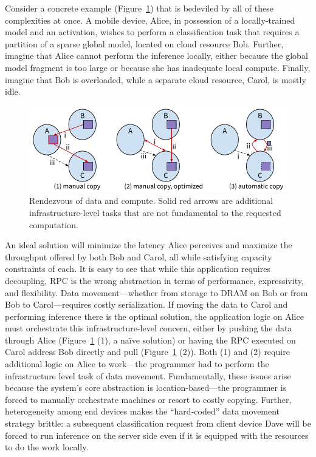 Consider a concrete example (Figure~\ref{fig:rpccopy}) that is bedeviled by all of these complexities at once. A mobile device,
Alice, in possession of a locally-trained model and an activation, wishes to perform a
classification task that requires a partition of a sparse global model, located on cloud resource
Bob. Further, imagine that Alice cannot perform the inference locally, either because the global
model fragment is too large or because she has inadequate local compute. Finally, imagine that Bob
is overloaded, while a separate cloud resource, Carol, is mostly idle.


\begin{figure}
    \centering
    \includegraphics[width=\linewidth]{fig/copy}
    \caption{Rendezvous of data and compute. Solid red arrows are additional
        infrastructure-level tasks that are not fundamental to the requested computation.}
    \label{fig:rpccopy}
\end{figure}

An ideal solution will minimize the latency Alice perceives and maximize the throughput offered
by both Bob and Carol, all while satisfying capacity constraints of each. It is easy to see
that while this application requires decoupling, RPC is the wrong abstraction in terms of performance,
expressivity, and flexibility.  Data movement---whether from storage to DRAM on Bob or from Bob
to Carol---requires costly serialization. If moving the data to Carol and performing
inference there is the optimal solution, the application logic on Alice must orchestrate this
infrastructure-level concern, either by pushing the data through Alice (Figure~\ref{fig:rpccopy} (1), a na\"ive solution)
or having the RPC executed
on Carol address Bob directly and pull (Figure~\ref{fig:rpccopy} (2)).
Both (1) and (2) require additional logic on Alice
to work---the programmer had to perform the infrastructure level task of data
movement.  Fundamentally, these issues arise because the system's core abstraction is
location-based---the programmer is forced to manually orchestrate machines or resort to
costly copying.
Further,
heterogeneity among end devices makes the ``hard-coded'' data movement strategy
brittle:
a subsequent classification request from client device Dave will be forced to run inference
on the server side even if it is equipped with the resources to do the work locally.


